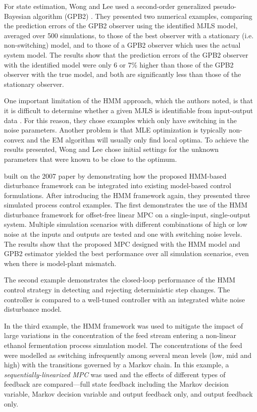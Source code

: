 For state estimation, Wong and Lee used a second-order generalized pseudo-Bayesian algorithm (GPB2)  \citep{bar-shalom_estimation_1993}. They presented two numerical examples, comparing the prediction errors of the GPB2 observer using the identified MJLS model, averaged over 500 simulations, to those of the best observer with a stationary (i.e. non-switching) model, and to those of a GPB2 observer which uses the actual system model.  The results show that the prediction errors of the GPB2 observer with the identified model were only 6 or 7\% higher than those of the GPB2 observer with the true model, and both are significantly less than those of the stationary observer.

One important limitation of the HMM approach, which the authors noted, is that it is difficult to determine whether a given MJLS is identifiable from input-output data \citep{vidal_observability_2002}. For this reason, they chose examples which only have switching in the noise parameters. Another problem is that MLE optimization is typically non-convex and the EM algorithm will usually only find local optima. To achieve the results presented, Wong and Lee chose initial settings for the unknown parameters that were known to be close to the optimum.

\cite{wong_realistic_2009} built on the 2007 paper by demonstrating how the proposed HMM-based disturbance framework can be integrated into existing model-based control formulations. After introducing the HMM framework again, they presented three simulated process control examples. The first demonstrates the use of the HMM disturbance framework for offset-free linear MPC on a single-input, single-output system. Multiple simulation scenarios with different combinations of high or low noise at the inputs and outputs are tested and one with switching noise levels. The results show that the proposed MPC designed with the HMM model and GPB2 estimator yielded the best performance over all simulation scenarios, even when there is model-plant mismatch.

The second example demonstrates the closed-loop performance of the HMM control strategy in detecting and rejecting deterministic step changes. The controller is compared to a well-tuned controller with an integrated white noise disturbance model.

In the third example, the HMM framework was used to mitigate the impact of large variations in the concentration of the feed stream entering a non-linear ethanol fermentation process simulation model. The concentrations of the feed were modelled as switching infrequently among several mean levels (low, mid and high) with the transitions governed by a Markov chain. In this example, a \textit{sequentially-linearized MPC} \citep{lee_extended_1994} was used and the effects of different types of feedback are compared---full state feedback including the Markov decision variable, Markov decision variable and output feedback only, and output feedback only.

